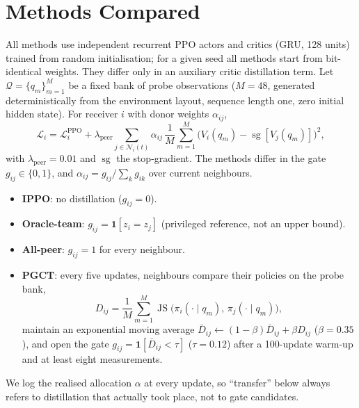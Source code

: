 \documentclass{article}
\newcommand{\sg}{\operatorname{sg}}
\newcommand{\JS}{\operatorname{JS}}
\begin{document}
\section{Methods Compared}
All methods use independent recurrent PPO actors and critics (GRU, 128 units) trained from random initialisation;
for a given seed all methods start from bit-identical weights. They differ only in an auxiliary critic
distillation term. Let $\mathcal{Q}=\{q_m\}_{m=1}^{M}$ be a fixed bank of probe observations ($M=48$, generated
deterministically from the environment layout, sequence length one, zero initial hidden state).
For receiver $i$ with donor weights $\alpha_{ij}$,
\begin{equation}
  \mathcal{L}_i = \mathcal{L}^{\mathrm{PPO}}_i + \lambda_{\mathrm{peer}} \sum_{j\in\mathcal{N}_i(t)} \alpha_{ij}\,
  \frac{1}{M}\sum_{m=1}^{M}\big(V_i(q_m) - \sg[V_j(q_m)]\big)^2 ,
\end{equation}
with $\lambda_{\mathrm{peer}}=0.01$ and $\sg$ the stop-gradient. The methods differ in the gate $g_{ij}\in\{0,1\}$,
and $\alpha_{ij}=g_{ij}/\sum_k g_{ik}$ over current neighbours.
\begin{itemize}
  \item \textbf{IPPO}: no distillation ($g_{ij}=0$).
  \item \textbf{Oracle-team}: $g_{ij}=\mathbf{1}[z_i=z_j]$ (privileged reference, not an upper bound).
  \item \textbf{All-peer}: $g_{ij}=1$ for every neighbour.
  \item \textbf{PGCT}: every five updates, neighbours compare their policies on the probe bank,
  \begin{equation}
    D_{ij} = \frac{1}{M}\sum_{m=1}^{M} \JS\big(\pi_i(\cdot\mid q_m),\, \pi_j(\cdot\mid q_m)\big),
  \end{equation}
  maintain an exponential moving average $\bar D_{ij}\leftarrow(1-\beta)\bar D_{ij}+\beta D_{ij}$ ($\beta=0.35$),
  and open the gate $g_{ij}=\mathbf{1}[\bar D_{ij}<\tau]$ ($\tau=0.12$) after a 100-update warm-up and at least eight
  measurements.
\end{itemize}
We log the realised allocation $\alpha$ at every update, so ``transfer'' below always refers to distillation that
actually took place, not to gate candidates.
\end{document}
